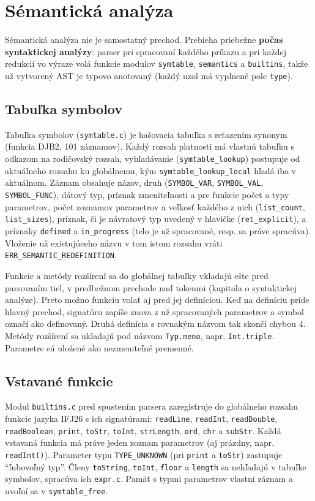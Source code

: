\section{Sémantická analýza}

Sémantická analýza nie je samostatný prechod. Prebieha priebežne \textbf{počas syntaktickej analýzy}: parser pri spracovaní každého príkazu a pri každej redukcii vo výraze volá funkcie modulov \texttt{symtable}, \texttt{semantics} a \texttt{builtins}, takže už vytvorený AST je typovo anotovaný (každý uzol má vyplnené pole \texttt{type}).

\subsection{Tabuľka symbolov}
Tabuľka symbolov (\texttt{symtable.c}) je hašovacia tabuľka s reťazením synonym (funkcia DJB2, 101 záznamov). Každý rozsah platnosti má vlastnú tabuľku s odkazom na rodičovský rozsah, vyhľadávanie (\texttt{symtable\_lookup}) postupuje od aktuálneho rozsahu ku globálnemu, kým \texttt{symtable\_lookup\_local} hľadá iba v aktuálnom. Záznam obsahuje názov, druh (\texttt{SYMBOL\_VAR}, \texttt{SYMBOL\_VAL}, \texttt{SYMBOL\_FUNC}), dátový typ, príznak zmeniteľnosti a pre funkcie počet a typy parametrov, počet zoznamov parametrov a veľkosť každého z nich (\texttt{list\_count}, \texttt{list\_sizes}), príznak, či je návratový typ uvedený v hlavičke (\texttt{ret\_explicit}), a príznaky \texttt{defined} a \texttt{in\_progress} (telo je už spracované, resp. sa práve spracúva). Vloženie už existujúceho názvu v tom istom rozsahu vráti \texttt{ERR\_SEMANTIC\_REDEFINITION}.

Funkcie a metódy rozšírení sa do globálnej tabuľky vkladajú ešte pred parsovaním tiel, v predbežnom prechode nad tokenmi (kapitola o syntaktickej analýze). Preto možno funkciu volať aj pred jej definíciou. Keď na definíciu príde hlavný prechod, signatúru zapíše znova z už spracovaných parametrov a symbol označí ako definovaný. Druhá definícia s rovnakým názvom tak skončí chybou 4. Metódy rozšírení sa ukladajú pod názvom \texttt{Typ.meno}, napr. \texttt{Int.triple}. Parametre sú uložené ako nezmeniteľné premenné.

\subsection{Vstavané funkcie}
Modul \texttt{builtins.c} pred spustením parsera zaregistruje do globálneho rozsahu funkcie jazyka IFJ26 s ich signatúrami: \texttt{readLine}, \texttt{readInt}, \texttt{readDouble}, \texttt{readBoolean}, \texttt{print}, \texttt{toStr}, \texttt{toInt}, \texttt{strLength}, \texttt{ord}, \texttt{chr} a \texttt{subStr}. Každá vstavaná funkcia má práve jeden zoznam parametrov (aj prázdny, napr. \texttt{readInt()}). Parameter typu \texttt{TYPE\_UNKNOWN} (pri \texttt{print} a \texttt{toStr}) zastupuje ``ľubovoľný typ''. Členy \texttt{toString}, \texttt{toInt}, \texttt{floor} a \texttt{length} sa nehľadajú v tabuľke symbolov, spracúva ich \texttt{expr.c}. Pamäť s typmi parametrov vlastní záznam a uvoľní sa v \texttt{symtable\_free}.

